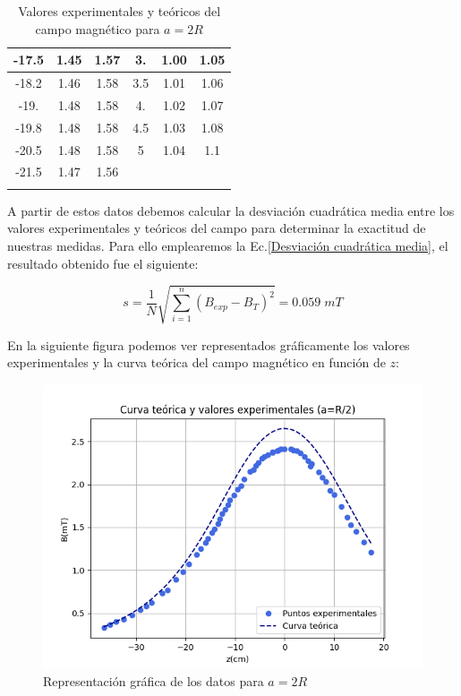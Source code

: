 \documentclass[a4paper,12pt,titlepage]{article}
\begin{document}
\begin{longtable}[ht]{|c|c|c|c|c|c|}
    -17.5 & 1.45 & 1.57 & 3.    & 1.00 & 1.05 \\ \hline
    -18.2 & 1.46 & 1.58 & 3.5   & 1.01 & 1.06 \\ \hline
    -19.  & 1.48 & 1.58 & 4.    & 1.02 & 1.07 \\ \hline
    -19.8 & 1.48 & 1.58 & 4.5   & 1.03 & 1.08 \\ \hline
    -20.5 & 1.48 & 1.58 & 5     & 1.04 & 1.1  \\ \hline
    -21.5 & 1.47 & 1.56 &       &      &      \\ \hline
    \caption{Valores experimentales y teóricos del campo magnético para $a=2R$}
    \label{Datos a2R}
\end{longtable}



A partir de estos datos debemos calcular la desviación cuadrática media entre los valores experimentales y teóricos del campo para determinar la exactitud de nuestras medidas. Para ello emplearemos la Ec.\ref{Desviación cuadrática media}, el resultado obtenido fue el siguiente:

\begin{equation}
    s = \frac{1}{N} \sqrt{\sum_{i=1}^{n} (B_{exp} - B_T)^2} = 0.059 \; mT
\end{equation}

En la siguiente figura podemos ver representados gráficamente los valores experimentales y la curva teórica del campo magnético en función de $z$:

\begin{figure}[h!]
    \centering
    \includegraphics[width=0.85\linewidth]{Images/CurvaB2.png}
    \caption{Representación gráfica de los datos para $a=2R$}
\end{figure}
\end{document}
